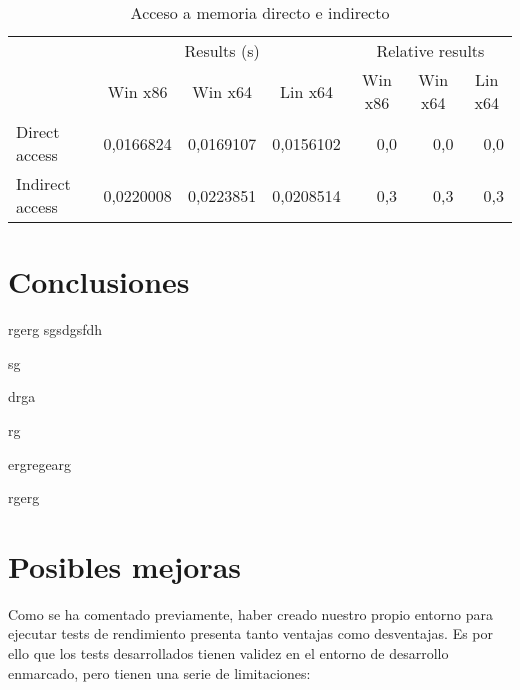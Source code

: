 \begin{table}[h]
\centering
\begin{tabular}{@{}l|crr|crr|@{}}
\cmidrule(l){2-7}
                                      & \multicolumn{3}{c|}{Results (s)}                                                                & \multicolumn{3}{c|}{Relative results}                                                      \\ \cmidrule(l){2-7} 
                                      & \multicolumn{1}{c|}{Win x86}  & \multicolumn{1}{c|}{Win x64} & \multicolumn{1}{c|}{Lin x64} & \multicolumn{1}{c|}{Win x86} & \multicolumn{1}{c|}{Win x64} & \multicolumn{1}{c|}{Lin x64} \\ \midrule
\multicolumn{1}{|l|}{Direct access}   & \multicolumn{1}{r}{0,0166824} & 0,0169107                    & 0,0156102                    & \multicolumn{1}{r}{0,0}      & 0,0                          & 0,0                          \\ \cmidrule(r){1-1}
\multicolumn{1}{|l|}{Indirect access} & \multicolumn{1}{r}{0,0220008} & 0,0223851                    & 0,0208514                    & \multicolumn{1}{r}{0,3}      & 0,3                          & 0,3                          \\ \bottomrule
\end{tabular}
\caption{Acceso a memoria directo e indirecto}
\end{table}

\section{Conclusiones}

rgerg
sgsdgsfdh

sg

drga

rg

ergregearg

rgerg

\section{Posibles mejoras}

Como se ha comentado previamente, haber creado nuestro propio entorno para ejecutar tests de rendimiento presenta tanto ventajas como desventajas. Es por ello que los tests desarrollados tienen validez en el entorno de desarrollo enmarcado, pero tienen una serie de limitaciones:

